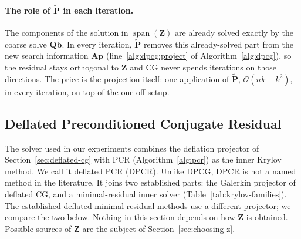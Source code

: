 \paragraph{The role of $\tilde{\mathbf{P}}$ in each iteration.}
The components of the solution in $\operatorname{span}(\mathbf{Z})$ are already
solved exactly by the coarse solve $\mathbf{Q}\mathbf{b}$. In every iteration,
$\tilde{\mathbf{P}}$ removes this already-solved part from the new search
information $\mathbf{A}\mathbf{p}$ (line~\ref{alg:dpcg:project} of Algorithm~\ref{alg:dpcg}), so the
residual stays orthogonal to $\mathbf{Z}$ and CG never spends iterations on
those directions. The price is the projection itself: one application of
$\tilde{\mathbf{P}}$, $\mathcal{O}(nk + k^2)$, in every iteration, on top of the
one-off setup.

\subsection{Deflated Preconditioned Conjugate Residual}
\label{sec:dpcr}

The solver used in our experiments combines the deflation projector of
Section~\ref{sec:deflated-cg} with PCR (Algorithm~\ref{alg:pcr}) as the
inner Krylov method. We call it deflated PCR (DPCR). Unlike DPCG, DPCR is
not a named method in the literature. It joins two established parts: the
Galerkin projector of deflated CG, and a minimal-residual inner solver
(Table~\ref{tab:krylov-families}). The established deflated
minimal-residual methods use a different projector; we compare the two
below. Nothing in this section depends on how $\mathbf{Z}$ is obtained.
Possible sources of $\mathbf{Z}$ are the subject of
Section~\ref{sec:choosing-z}.

